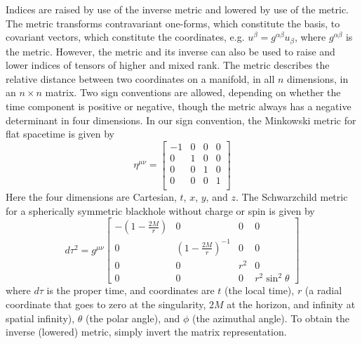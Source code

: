 Indices are raised by use of the inverse metric and lowered by use of the metric. The metric transforms contravariant one-forms, which constitute the basis, to covariant vectors, which constitute the coordinates, e.g. $u^\beta=g^{\alpha\beta}u_\beta$, where $g^{\alpha\beta}$ is the metric. However, the metric and its inverse can also be used to raise and lower indices of tensors of higher and mixed rank. The metric describes the relative distance between two coordinates on a manifold, in all $n$ dimensions, in an $n\times n$ matrix. Two sign conventions are allowed, depending on whether the time component is positive or negative, though the metric always has a negative determinant in four dimensions. In our sign convention, the Minkowski metric for flat spacetime is given by
\[
\eta^{\mu\nu}=
\begin{bmatrix}
  -1 & 0 & 0 & 0\\
  0 & 1 & 0 & 0\\
  0 & 0 & 1 & 0\\
  0 & 0 & 0 & 1\\
\end{bmatrix}
\]
Here the four dimensions are Cartesian, $t$, $x$, $y$, and $z$. The Schwarzchild metric for a spherically symmetric blackhole without charge or spin is given by
\[
d\tau^2=g^{\mu\nu}
\begin{bmatrix}
  -(1-\frac{2M}{r}) & 0 & 0 & 0\\
  0 & (1-\frac{2M}{r})^{-1} & 0 &0\\
  0 & 0 & r^2 & 0\\
  0 & 0 & 0 & r^2\sin^2\theta
\end{bmatrix}
\]
where $d\tau$ is the proper time, and coordinates are $t$ (the local time), $r$ (a radial coordinate that goes to zero at the singularity, $2M$ at the horizon, and infinity at spatial infinity), $\theta$ (the polar angle), and $\phi$ (the azimuthal angle). To obtain the inverse (lowered) metric, simply invert the matrix representation.
